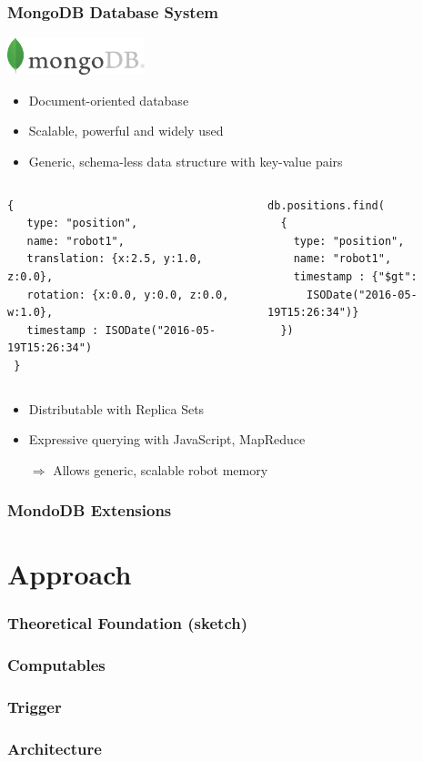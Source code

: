 \begin{frame}[fragile]
  \frametitle{MongoDB Database System}
  \includegraphics[width=0.3\textwidth]{../thesis/img/mongodb}
  \begin{itemize}
    \item Document-oriented database
    \item Scalable, powerful and widely used
    \item Generic, schema-less data structure with key-value pairs
  \end{itemize}
\begin{columns}
\begin{lstlisting}[style=ReallySmallJSON,
  framexleftmargin=2pt, xleftmargin=2pt,
 morekeywords={}, numbers=none]
 {
   type: "position",
   name: "robot1",
   translation: {x:2.5, y:1.0, z:0.0},
   rotation: {x:0.0, y:0.0, z:0.0, w:1.0},
   timestamp : ISODate("2016-05-19T15:26:34")
 }
\end{lstlisting}
\begin{lstlisting}[style=ReallySmallJSON,
  framexleftmargin=2pt, xleftmargin=10pt,
 morekeywords={}, numbers=none]
db.positions.find(
  {
    type: "position",
    name: "robot1",
    timestamp : {"$gt":
      ISODate("2016-05-19T15:26:34")}
  })
\end{lstlisting}%
\end{columns}
  \begin{itemize}
    \item Distributable with Replica Sets
    \item Expressive querying with JavaScript, MapReduce
    \item[$\Rightarrow$] Allows generic, scalable robot memory
  \end{itemize}
\end{frame}

\begin{frame}
  \frametitle{MondoDB Extensions}
\end{frame}


\section{Approach}
\begin{frame}
  \frametitle{Theoretical Foundation (sketch)}
\end{frame}
\begin{frame}
  \frametitle{Computables}
\end{frame}
\begin{frame}
  \frametitle{Trigger}
\end{frame}
\begin{frame}
  \frametitle{Architecture}
\end{frame}
